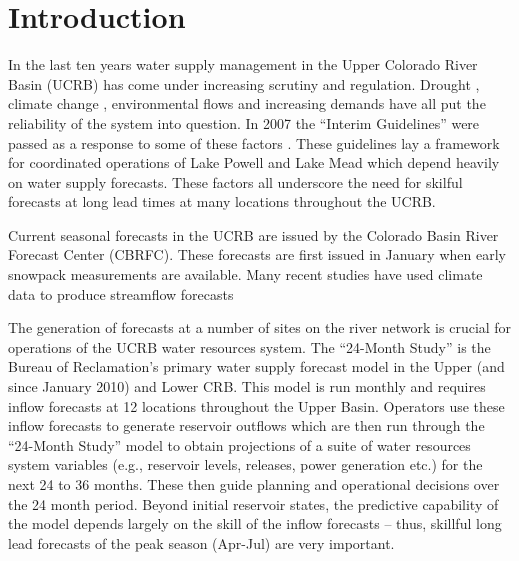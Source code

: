 \documentclass[final,5p,times,twocolumn,authoryear]{elsarticle}
\begin{document}


\section{Introduction}
In the last ten years water supply management in the Upper Colorado River Basin (UCRB) has come under increasing scrutiny and regulation. Drought \citep{Fulp:2005wy}, climate change \citep{Balaji2009}, environmental flows and increasing demands \citep{USDepartmentoftheInterior:2008vl} have all put the reliability of the system into question.  In 2007 the ``Interim Guidelines'' were passed as a response to some of these factors \citep{USDepartmentoftheInterior:2007ua}.  These guidelines lay a framework for coordinated operations of Lake Powell and Lake Mead which depend heavily on water supply forecasts.   These factors all underscore the need for skilful forecasts at long lead times at many locations throughout the UCRB.  

Current seasonal forecasts in the UCRB are issued by the Colorado Basin River Forecast Center (CBRFC). These forecasts are first issued in January when early snowpack measurements are available. Many recent studies have used climate data to produce streamflow forecasts 

The generation of forecasts at a number of sites on the river network is crucial for operations of the UCRB water resources system.  The ``24-Month Study'' is the Bureau of Reclamation's primary water supply forecast model in the Upper (and since January 2010) and Lower CRB.  This model is run monthly and requires inflow forecasts at 12 locations throughout the Upper Basin.  Operators use these inflow forecasts to generate reservoir outflows which are then run through the ``24-Month Study'' model to obtain projections of a suite of water resources system variables (e.g., reservoir levels, releases, power generation etc.) for the next 24 to 36 months. These then guide planning and operational decisions over the 24 month period. Beyond initial reservoir states, the predictive capability of the model depends largely on the skill of the inflow forecasts -- thus, skillful long lead forecasts of the peak season (Apr-Jul) are very important.
\end{document}
